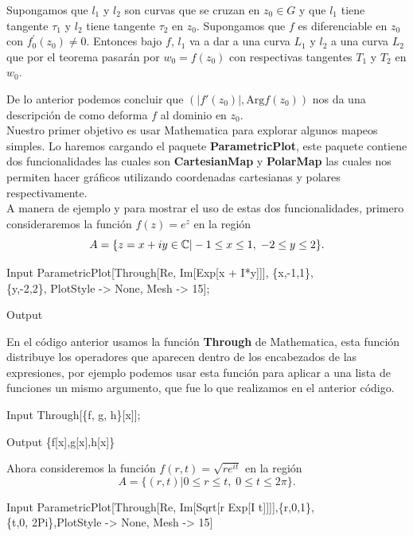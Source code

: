 \begin{coro}
	Supongamos que $l_1$ y $l_2$ son curvas que se cruzan en $z_0\in G$ y que $l_1$ tiene tangente $\tau_1$ y $l_2$ tiene tangente $\tau_2$ en $z_0$. Supongamos que $f$ es diferenciable en $z_0$ con $f^{'}_0(z_0)\neq 0$. Entonces bajo $f$, $l_1$ va a dar a una curva $L_1$ y $l_2$ a una curva $L_2$ que por el teorema pasarán por $w_0 = f(z_0)$ con respectivas tangentes $T_1$ y $T_2$ en $w_0$.
\end{coro}
De lo anterior podemos concluir que $(|f'(z_0)|,\mbox{Arg}f(z_0))$ nos da una descripción de como deforma $f$ al dominio en $z_0$.\\
Nuestro primer objetivo es usar Mathematica para explorar algunos mapeos simples. Lo haremos cargando el paquete \textbf{ParametricPlot}, este paquete contiene dos funcionalidades las cuales son  \textbf{CartesianMap} y \textbf{PolarMap} las cuales nos permiten hacer gráficos utilizando coordenadas cartesianas y polares respectivamente. \\
A manera de ejemplo y para mostrar el uso de estas dos funcionalidades, primero consideraremos la función $f(z)=e^{z}$ en la región $$A=\{z=x+iy\in\mathbb{C} | -1\leq x\leq 1, \; -2\leq y\leq 2\}.$$

\begin{mmaCell}{Input}
	 ParametricPlot[Through[{Re, Im}[Exp[x + I*y]]], \{x,-1,1\},\\\{y,-2,2\},  PlotStyle -> None, Mesh -> 15];
\end{mmaCell}


\begin{mmaCell}[moregraphics={moreig={scale=0.4}}]{Output}
\end{mmaCell}
En el código anterior usamos la función \textbf{Through} de Mathematica, esta función distribuye los operadores que aparecen dentro de los encabezados de las expresiones, por ejemplo podemos usar esta función para aplicar a una lista de funciones un mismo argumento, que fue lo que realizamos en el anterior código.
\begin{mmaCell}{Input}
	 Through[\{f, g, h\}[x]];
\end{mmaCell}
\begin{mmaCell}{Output}
	 \{f[x],g[x],h[x]\}
\end{mmaCell}
Ahora consideremos la función $f(r,t)=\sqrt{re^{it}}$ en la región
$$A=\{(r,t)| 0\leq r\leq t,\; 0\leq t\leq 2\pi \}.$$

\begin{mmaCell}{Input}
	 ParametricPlot[Through[{Re, Im}[Sqrt[r Exp[I t]]]],\{r,0,1\},\\\{t,0, 2Pi\},PlotStyle -> None, Mesh -> 15]
\end{mmaCell}

